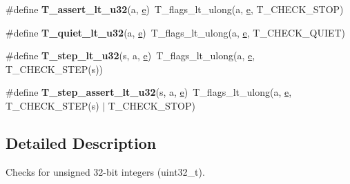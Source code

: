 \begin{DoxyCompactItemize}
\item 
\mbox{\label{group__RTEMSTestFrameworkChecksUInt32_gaebf850cd556932fe30fd4c8974cf0019}} 
\#define {\bfseries T\+\_\+assert\+\_\+lt\+\_\+u32}(a,  \mbox{\hyperlink{sun4u_2tte_8h_a8b0b9ed08e0e18920ec2682f48228c27}{e}})~T\+\_\+flags\+\_\+lt\+\_\+ulong(a, \mbox{\hyperlink{sun4u_2tte_8h_a8b0b9ed08e0e18920ec2682f48228c27}{e}}, T\+\_\+\+C\+H\+E\+C\+K\+\_\+\+S\+T\+OP)
\item 
\mbox{\label{group__RTEMSTestFrameworkChecksUInt32_gaec47ffeee10e3dd840ec63e277bf35f1}} 
\#define {\bfseries T\+\_\+quiet\+\_\+lt\+\_\+u32}(a,  \mbox{\hyperlink{sun4u_2tte_8h_a8b0b9ed08e0e18920ec2682f48228c27}{e}})~T\+\_\+flags\+\_\+lt\+\_\+ulong(a, \mbox{\hyperlink{sun4u_2tte_8h_a8b0b9ed08e0e18920ec2682f48228c27}{e}}, T\+\_\+\+C\+H\+E\+C\+K\+\_\+\+Q\+U\+I\+ET)
\item 
\mbox{\label{group__RTEMSTestFrameworkChecksUInt32_ga691320f8416eb6aaa41ec93530dc26a2}} 
\#define {\bfseries T\+\_\+step\+\_\+lt\+\_\+u32}(s,  a,  \mbox{\hyperlink{sun4u_2tte_8h_a8b0b9ed08e0e18920ec2682f48228c27}{e}})~T\+\_\+flags\+\_\+lt\+\_\+ulong(a, \mbox{\hyperlink{sun4u_2tte_8h_a8b0b9ed08e0e18920ec2682f48228c27}{e}}, T\+\_\+\+C\+H\+E\+C\+K\+\_\+\+S\+T\+EP(s))
\item 
\mbox{\label{group__RTEMSTestFrameworkChecksUInt32_ga90e173f2997f5cce33aeb78d2ef4d366}} 
\#define {\bfseries T\+\_\+step\+\_\+assert\+\_\+lt\+\_\+u32}(s,  a,  \mbox{\hyperlink{sun4u_2tte_8h_a8b0b9ed08e0e18920ec2682f48228c27}{e}})~T\+\_\+flags\+\_\+lt\+\_\+ulong(a, \mbox{\hyperlink{sun4u_2tte_8h_a8b0b9ed08e0e18920ec2682f48228c27}{e}}, T\+\_\+\+C\+H\+E\+C\+K\+\_\+\+S\+T\+EP(s) $\vert$ T\+\_\+\+C\+H\+E\+C\+K\+\_\+\+S\+T\+OP)
\end{DoxyCompactItemize}


\subsection{Detailed Description}
Checks for unsigned 32-\/bit integers (uint32\+\_\+t). 


